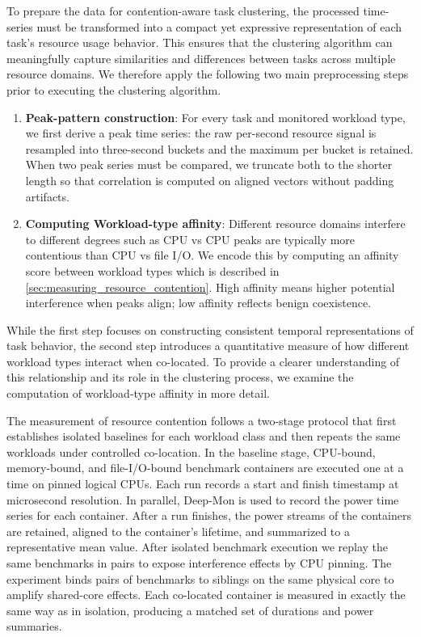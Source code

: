 To prepare the data for contention-aware task clustering, the processed time-series must be transformed into a compact yet expressive representation of each task's resource usage behavior. This ensures that the clustering algorithm can meaningfully capture similarities and differences between tasks across multiple resource domains. We therefore apply the following two main preprocessing steps prior to executing the clustering algorithm.

\begin{enumerate}
    \item \textbf{Peak-pattern construction}: For every task and monitored workload type, we first derive a peak time series: the raw per-second resource signal is resampled into three-second buckets and the maximum per bucket is retained. When two peak series must be compared, we truncate both to the shorter length so that correlation is computed on aligned vectors without padding artifacts.
    \item \textbf{Computing Workload-type affinity}: Different resource domains interfere to different degrees such as CPU vs CPU peaks are typically more contentious than CPU vs file I/O. We encode this by computing an affinity score between workload types which is described in \ref{sec:measuring_resource_contention}. High affinity means higher potential interference when peaks align; low affinity reflects benign coexistence.
\end{enumerate}

While the first step focuses on constructing consistent temporal representations of task behavior, the second step introduces a quantitative measure of how different workload types interact when co-located. To provide a clearer understanding of this relationship and its role in the clustering process, we examine the computation of workload-type affinity in more detail.

\label{sec:measuring_resource_contention}

The measurement of resource contention follows a two-stage protocol that first establishes isolated baselines for each workload class and then repeats the same workloads under controlled co-location. In the baseline stage, CPU-bound, memory-bound, and file-I/O-bound benchmark containers are executed one at a time on pinned logical CPUs. Each run records a start and finish timestamp at microsecond resolution. In parallel, Deep-Mon is used to record the power time series for each container. After a run finishes, the power streams of the containers are retained, aligned to the container's lifetime, and summarized to a representative mean value.
After isolated benchmark execution we replay the same benchmarks in pairs to expose interference effects by CPU pinning. The experiment binds pairs of benchmarks to siblings on the same physical core to amplify shared-core effects. Each co-located container is measured in exactly the same way as in isolation, producing a matched set of durations and power summaries.


